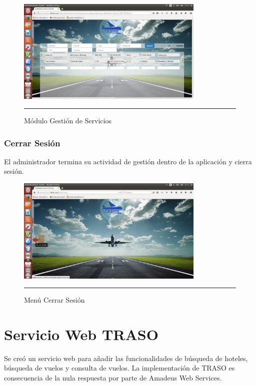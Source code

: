 \begin{figure}[h!]
	\centering
		\includegraphics[width=0.8\textwidth]{Figuras/servicioswb.png}
		\rule{35em}{0.5pt}
	\caption[Módulo Gestión de Servicios]{Módulo Gestión de Servicios}
	\label{fig:moduloUsuarios}
\end{figure}

\subsubsection{Cerrar Sesión}
El administrador termina su actividad de gestión dentro de la aplicación y cierra sesión.
\begin{figure}[h!]
	\centering
		\includegraphics[width=0.8\textwidth]{Figuras/indexCerrarSesion.png}
		\rule{35em}{0.5pt}
	\caption[Menú Cerrar Sesión]{Menú Cerrar Sesión}
	\label{fig:menuCerrar}
\end{figure}
\clearpage

\section{Servicio Web TRASO}

Se creó un servicio web para añadir las funcionalidades de búsqueda de hoteles, búsqueda de vuelos y consulta de vuelos. La implementación de TRASO es consecuencia de la nula respuesta por parte de Amadeus Web Services. 

